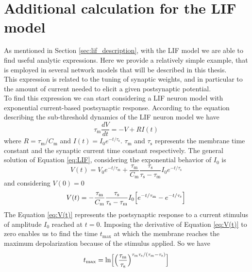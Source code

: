 \documentclass[a4paper, 12pt, twoside, openright]{book}
\begin{document}
\section{Additional calculation for the LIF model}
\label{sec:lif_additional_eqs}
As mentioned in Section \ref{sec:lif_description}, with the LIF model we are able to find useful analytic expressions. Here we provide a relatively simple example, that is employed in several network models that will be described in this thesis.\\
This expression is related to the tuning of synaptic weights, and in particular to the amount of current needed to elicit a given postsynaptic potential.\\
To find this expression we can start considering a LIF neuron model with exponential current-based postsynaptic response. According to the equation describing the sub-threshold dynamics of the LIF neuron model we have
\begin{equation}
    \tau_{\text{m}} \dfrac{dV}{dt}=-V+RI(t)
    \label{eq:LIF}
\end{equation}
where $R=\tau_{\text{m}}/C_{\text{m}}$ and $I(t) = I_0 e^{-t/\tau_{\text{s}}}$. $\tau_{\text{m}}$ and $\tau_{\text{s}}$ represents the membrane time constant and the synaptic current time constant respectively. The general solution of Equation \eqref{eq:LIF}, considering the exponential behavior of $I_0$ is
\begin{equation}
    V(t)=V_0e^{-t/\tau_{\text{m}}}+\dfrac{\tau_{\text{m}}}{C_{\text{m}}}\dfrac{\tau_{\text{s}}}{\tau_{\text{s}}-\tau_{\text{m}}}I_0e^{-t/\tau_{\text{s}}}
    \label{eq:V}
\end{equation}
and considering $V(0)=0$
\begin{equation}
    V(t)=-\dfrac{\tau_{\text{m}}}{C_{\text{m}}}\dfrac{\tau_{\text{s}}}{\tau_{\text{s}}-\tau_{\text{m}}}I_0 \Bigl[ e^{-t/\tau_{\text{m}}}- e^{-t/\tau_{\text{s}}}\Bigr]
    \label{eq:V(t)}
\end{equation}
The Equation \eqref{eq:V(t)} represents the postsynaptic response to a current stimulus of amplitude $I_0$ reached at $t=0$. Imposing the derivative of Equation \eqref{eq:V(t)} to zero enables us to find the time $t_{\text{max}}$ at which the membrane reaches the maximum depolarization because of the stimulus applied. So we have
\begin{equation}
    t_{\text{max}}=\ln\Bigl[ \Bigl(\dfrac{\tau_{\text{m}}}{\tau_{\text{s}}}\Bigr)^{\tau_{\text{m}}\tau_{\text{s}}/(\tau_{\text{m}}-\tau_{\text{s}})}  \Bigr]
    \label{eq:t_MAX}
\end{equation}
\end{document}
